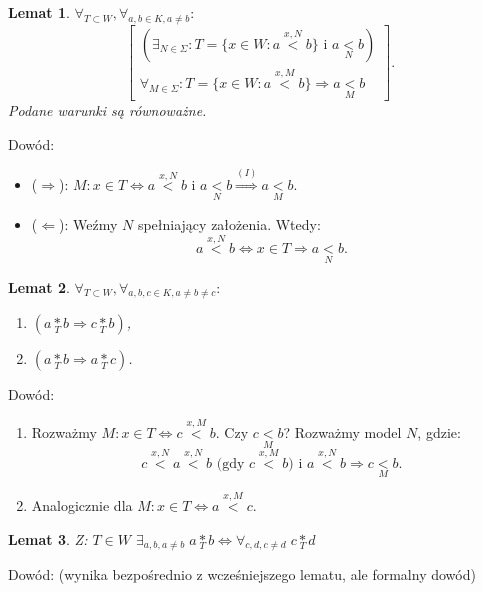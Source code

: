 \documentclass[12pt,a4paper]{article}
\theoremstyle{break}
\newtheorem{lemma}{Lemat}[section]
\begin{document}
	\begin{lemma}
		$\forall_{T \subset W}, \forall_{a, b \in K, a \neq b}:$
		\[
		\begin{bmatrix}
			(\exists_{N \in \Sigma} : T = \{x \in W : a \overset{x,N}{<} b\} \text{ i } a \underset{N}{<} b) \\
			\forall_{M \in \Sigma}: T = \{x \in W : a \overset{x,M}{<} b\} \Rightarrow a \underset{M}{<} b
		\end{bmatrix}.
		\]
		Podane warunki są równoważne.
	\end{lemma}
	
	Dowód:
	\begin{itemize}
		\item ($\Rightarrow$): $M : x \in T \Leftrightarrow a \overset{x,N}{<} b$ i $a \underset{N}{<} b \overset{(I)}{\Rightarrow} a \underset{M}{<} b$.
		\item ($\Leftarrow$): Weźmy $N$ spełniający założenia. Wtedy:
		\[
		a \overset{x,N}{<} b \Leftrightarrow x \in T \Rightarrow a \underset{N}{<} b.
		\]
	\end{itemize}
	
	\begin{lemma}
		$\forall_{T \subset W}, \forall_{a, b, c \in K, a \neq b \neq c}:$
		\begin{enumerate}
			\item $(a \underset{T}{*} b \Rightarrow c \underset{T}{*} b)$,
			\item $(a \underset{T}{*} b \Rightarrow a \underset{T}{*} c)$.
		\end{enumerate}
	\end{lemma}
	
	Dowód:
	\begin{enumerate}
		\item[Ad 1.] Rozważmy $M: x \in T \Leftrightarrow c \overset{x,M}{<} b$. Czy $c \underset{M}{<} b$?
		Rozważmy model $N$, gdzie:
		\[
		c \overset{x,N}{<} a \overset{x,N}{<} b \text{ (gdy } c \overset{x,M}{<} b \text{) i } a \overset{x,N}{<} b \Rightarrow c \underset{M}{<} b.
		\]
		
		\item[Ad 2.] Analogicznie dla $M : x \in T \Leftrightarrow a \overset{x,M}{<} c$.
	\end{enumerate}
	\begin{lemma}
		Z: $T \in W$  
		$\exists_{a,b, a\neq b} \; a\underset{T}{*}b \Leftrightarrow \forall_{c,d, c\neq d} \; c\underset{T}{*}d$
	\end{lemma}
	
	Dowód: (wynika bezpośrednio z wcześniejszego lematu, ale formalny dowód)  
	
\end{document}
